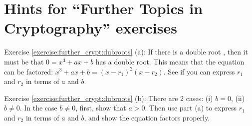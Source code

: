 \section{Hints for ``Further  Topics in Cryptography'' exercises}\label{sec:further_crypt:hints}

\noindent Exercise \ref{exercise:further_crypt:dubroots} (a):  If there is a double root , then it must be that $0 = x^3 + ax + b$ has a double root. This means that the equation can be factored:  $x^3 + ax+b = (x-r_1)^2(x-r_2)$.  See if you can express $r_1$ and $r_2$ in terms of $a$ and $b$.  

\noindent Exercise \ref{exercise:further_crypt:dubroots} (b):  There are 2 cases: (i) $b=0$, (ii) $b \neq 0$. In the case $b \neq 0$, first, show that $a > 0$.  Then use part (a) to express $r_1$ and $r_2$ in terms of $a$ and $b$, and show the equation factors properly.

